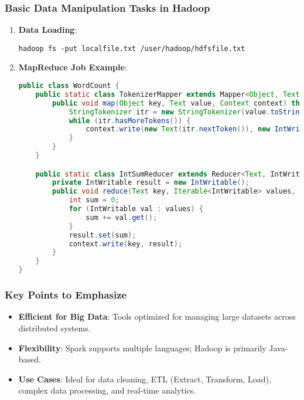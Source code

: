 \documentclass[aspectratio=169]{beamer}
\begin{document}
\begin{frame}[fragile]
    \frametitle{Basic Data Manipulation Tasks in Hadoop}
    \begin{enumerate}
        \item \textbf{Data Loading}:
        \begin{lstlisting}
hadoop fs -put localfile.txt /user/hadoop/hdfsfile.txt
        \end{lstlisting}

        \item \textbf{MapReduce Job Example}:
        \begin{lstlisting}[language=java]
public class WordCount {
    public static class TokenizerMapper extends Mapper<Object, Text, Text, IntWritable> {
        public void map(Object key, Text value, Context context) throws IOException, InterruptedException {
            StringTokenizer itr = new StringTokenizer(value.toString());
            while (itr.hasMoreTokens()) {
                context.write(new Text(itr.nextToken()), new IntWritable(1));
            }
        }
    }

    public static class IntSumReducer extends Reducer<Text, IntWritable, Text, IntWritable> {
        private IntWritable result = new IntWritable();
        public void reduce(Text key, Iterable<IntWritable> values, Context context) throws IOException, InterruptedException {
            int sum = 0;
            for (IntWritable val : values) {
                sum += val.get();
            }
            result.set(sum);
            context.write(key, result);
        }
    }
}
        \end{lstlisting}
    \end{enumerate}
\end{frame}

\begin{frame}[fragile]
    \frametitle{Key Points to Emphasize}
    \begin{itemize}
        \item \textbf{Efficient for Big Data}: Tools optimized for managing large datasets across distributed systems.
        \item \textbf{Flexibility}: Spark supports multiple languages; Hadoop is primarily Java-based.
        \item \textbf{Use Cases}: Ideal for data cleaning, ETL (Extract, Transform, Load), complex data processing, and real-time analytics.
    \end{itemize}
\end{frame}
\end{document}
